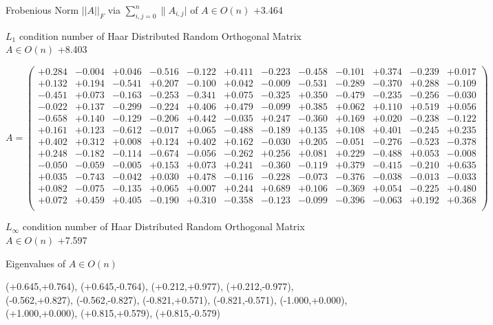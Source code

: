 \documentclass[9pt]{article}
\theoremstyle{plain}
\theoremstyle{definition}
\theoremstyle{remark}
\numberwithin{equation}{section}
\begin{document}
Frobenious Norm  $||A||_{\textit{F}}$ via $\sum\limits_{i,j =0}^{n} \|A_{i,j}|$   of  $A \in O(n)$  +3.464

$L_1$ condition number of Haar Distributed Random Orthogonal Matrix $A \in O(n)$ +8.403

$A = \left(
\begin{array}{
cccccccccccc}
+0.284 & -0.004 & +0.046 & -0.516 & -0.122 & +0.411 & -0.223 & -0.458 & -0.101 & +0.374 & -0.239 & +0.017 \\
+0.132 & +0.194 & -0.541 & +0.207 & -0.100 & +0.042 & -0.009 & -0.531 & -0.289 & -0.370 & +0.288 & -0.109 \\
-0.451 & +0.073 & -0.163 & -0.253 & -0.341 & +0.075 & -0.325 & +0.350 & -0.479 & -0.235 & -0.256 & -0.030 \\
-0.022 & +0.137 & -0.299 & -0.224 & +0.406 & +0.479 & -0.099 & +0.385 & +0.062 & +0.110 & +0.519 & +0.056 \\
-0.658 & +0.140 & -0.129 & -0.206 & +0.442 & -0.035 & +0.247 & -0.360 & +0.169 & +0.020 & -0.238 & -0.122 \\
+0.161 & +0.123 & -0.612 & -0.017 & +0.065 & -0.488 & -0.189 & +0.135 & +0.108 & +0.401 & -0.245 & +0.235 \\
+0.402 & +0.312 & +0.008 & +0.124 & +0.402 & +0.162 & -0.030 & +0.205 & -0.051 & -0.276 & -0.523 & -0.378 \\
+0.248 & -0.182 & -0.114 & -0.674 & -0.056 & -0.262 & +0.256 & +0.081 & +0.229 & -0.488 & +0.053 & -0.008 \\
-0.050 & -0.059 & -0.005 & +0.153 & +0.073 & +0.241 & -0.360 & -0.119 & +0.379 & -0.415 & -0.210 & +0.635 \\
+0.035 & -0.743 & -0.042 & +0.030 & +0.478 & -0.116 & -0.228 & -0.073 & -0.376 & -0.038 & -0.013 & -0.033 \\
+0.082 & -0.075 & -0.135 & +0.065 & +0.007 & +0.244 & +0.689 & +0.106 & -0.369 & +0.054 & -0.225 & +0.480 \\
+0.072 & +0.459 & +0.405 & -0.190 & +0.310 & -0.358 & -0.123 & -0.099 & -0.396 & -0.063 & +0.192 & +0.368 \\
\end{array}
\right)$ \newline 

$L_{\infty}$ condition number of Haar Distributed Random Orthogonal Matrix $A \in O(n)$ +7.597

Eigenvalues of $A \in O(n)$

(+0.645,+0.764), (+0.645,-0.764), (+0.212,+0.977), (+0.212,-0.977), (-0.562,+0.827), (-0.562,-0.827), (-0.821,+0.571), (-0.821,-0.571), (-1.000,+0.000), (+1.000,+0.000), (+0.815,+0.579), (+0.815,-0.579)
\end{document}
